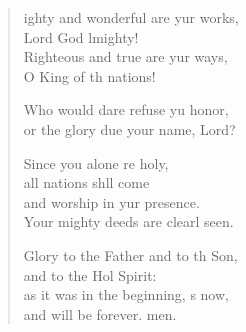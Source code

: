 \settowidth{\versewidth}{Mighty and wonderful are your works, *}
\begin{verse}%
  \begin{patverse}
ighty and wonderful are yur works,\Med\\
Lord God lmighty!\\
Righteous and true are yur ways,\Med\\
O King of th nations!

Who would dare refuse yu honor,\Med\\
or the glory due your name,  Lord?

Since you alone re holy,\Med\\
all nations shll come\\
and worship in yur presence.\Med\\
Your mighty deeds are clearl seen.

Glory to the Father and to th Son,\Med\\
and to the Hol Spirit:\\
as it was in the beginning, \pointup{\i}s now,\Med\\
and will be forever. men.
  \end{patverse}
\end{verse}
